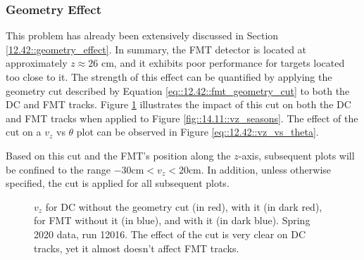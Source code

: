 \subsubsection{Geometry Effect}
\label{14.12::geometry_effect}
    This problem has already been extensively discussed in Section \ref{12.42::geometry_effect}.
    In summary, the FMT detector is located at approximately $z \approx 26$ cm, and it exhibits poor performance for targets located too close to it.
    The strength of this effect can be quantified by applying the geometry cut described by Equation \eqref{eq::12.42::fmt_geometry_cut} to both the DC and FMT tracks.
    Figure \ref{fig::14.12::vz_012016_geomcut} illustrates the impact of this cut on both the DC and FMT tracks when applied to Figure \ref{fig::14.11::vz_seasons}.
    The effect of the cut on a $v_z$ vs $\theta$ plot can be observed in Figure \ref{eq::12.42::vz_vs_theta}.

    Based on this cut and the FMT's position along the $z$-axis, subsequent plots will be confined to the range $-30 \text{cm} < v_z < 20 \text{cm}$.
    In addition, unless otherwise specified, the cut is applied for all subsequent plots.

    \begin{figure}[h!]
        \caption[$v_z$ for DC and FMT, w/ and w/out the geometry cut]
        {$v_z$ for DC without the geometry cut (in red), with it (in dark red), for FMT without it (in blue), and with it (in dark blue).
        Spring 2020 data, run 12016.
        The effect of the cut is very clear on DC tracks, yet it almost doesn't affect FMT tracks.}
        \label{fig::14.12::vz_012016_geomcut}
    \end{figure}
